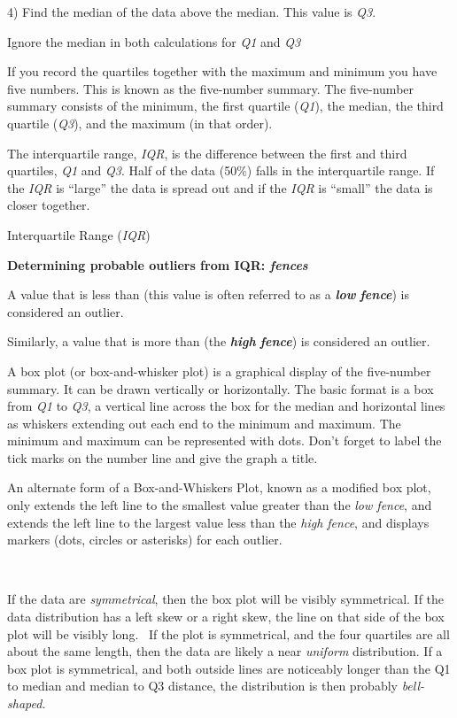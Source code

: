 \documentclass[]{book}
\begin{document}
4) Find the median of the data above the median. This value is \emph{Q3}.

Ignore the median in both calculations for \emph{Q1} and \emph{Q3}

If you record the quartiles together with the maximum and minimum you
have five numbers. This is known as the five-number summary. The
five-number summary consists of the minimum, the first quartile (\emph{Q1}),
the median, the third quartile (\emph{Q3}), and the maximum (in that order).

The interquartile range, \emph{IQR}, is the difference between the first and
third quartiles, \emph{Q1} and \emph{Q3}. Half of the data (50\%) falls in the
interquartile range. If the \emph{IQR} is ``large'' the data is spread out and
if the \emph{IQR} is ``small'' the data is closer together.

Interquartile Range (\emph{IQR})

\textbf{Determining probable outliers from IQR: \emph{fences}}

A value that is less than (this value is often referred to as a
\textbf{\emph{low}} \textbf{\emph{fence}}) is considered an outlier.

Similarly, a value that is more than (the \textbf{\emph{high}} \textbf{\emph{fence}}) is
considered an outlier.

A box plot (or box-and-whisker plot) is a graphical display of the
five-number summary. It can be drawn vertically or horizontally. The
basic format is a box from \emph{Q1} to \emph{Q3}, a vertical line across the box
for the median and horizontal lines as whiskers extending out each end
to the minimum and maximum. The minimum and maximum can be represented
with dots. Don't forget to label the tick marks on the number line and
give the graph a title.

An alternate form of a Box-and-Whiskers Plot, known as a modified box
plot, only extends the left line to the smallest value greater than the
\emph{low fence}, and extends the left line to the largest value less than
the \emph{high fence}, and displays markers (dots, circles or asterisks) for
each outlier.

~

If the data are \emph{symmetrical}, then the box plot will be visibly
symmetrical. If the data distribution has a left skew or a right skew,
the line on that side of the box plot will be visibly long.~ If the plot
is symmetrical, and the four quartiles are all about the same length,
then the data are likely a near \emph{uniform} distribution. If a box plot is
symmetrical, and both outside lines are noticeably longer than the Q1 to
median and median to Q3 distance, the distribution is then probably
\emph{bell-shaped.}
\end{document}
